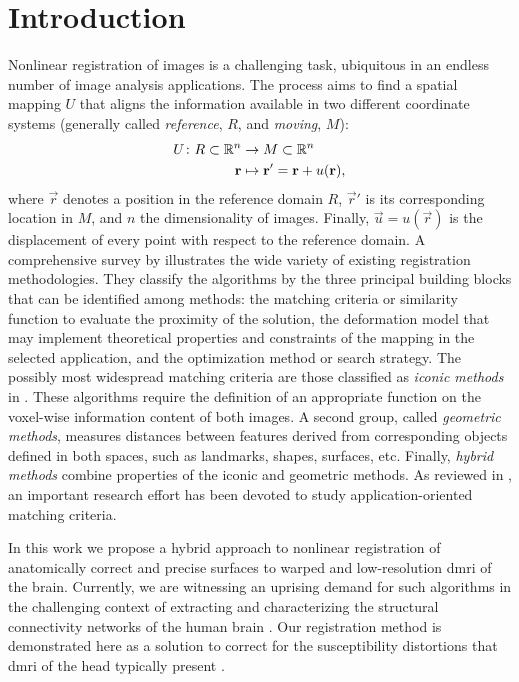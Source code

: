 \section*{Introduction}
\label{sec:introduction}

Nonlinear registration of images is a challenging task, ubiquitous
  in an endless number of image analysis applications.
The process aims to find a spatial mapping $U$ that aligns the information available
  in two different coordinate systems (generally called
  \emph{reference}, $R$, and \emph{moving}, $M$):
  \begin{align}
  U\colon R \subset \mathbb{R}^n &\to M \subset \mathbb{R}^n \notag\\
  \vec{r} &\mapsto \vec{r}' =\vec{r}+u(\vec{r}),
  \label{eq:transform}
  \end{align}
  where $\vec{r}$ denotes a position in the reference domain $R$, $\vec{r}'$ is
  its corresponding location in $M$, and $n$ the dimensionality of images.
Finally, $\vec{u} = u(\vec{r})$ is the displacement of every point with respect
  to the reference domain.
A comprehensive survey by \cite{sotiras_deformable_2013}
  illustrates the wide variety of existing registration methodologies.
They classify the algorithms by the three principal building blocks that can be identified
  among methods: the matching criteria or similarity function to evaluate the proximity of
  the solution, the deformation model that may implement theoretical properties and constraints
  of the mapping in the selected application, and the optimization method or search strategy.
The possibly most widespread matching criteria are those classified as \emph{iconic
  methods} in \citep{sotiras_deformable_2013}.
These algorithms require the definition of an appropriate function on the voxel-wise information
  content of both images.
A second group, called \emph{geometric methods}, measures distances between features derived from
  corresponding objects defined in both spaces, such as landmarks, shapes, surfaces, etc.
Finally, \emph{hybrid methods} combine properties of the iconic and geometric methods.
As reviewed in \citep{sotiras_deformable_2013}, an important research effort has been devoted to
  study application-oriented matching criteria.

In this work we propose a hybrid approach to nonlinear registration of anatomically correct
  and precise surfaces to warped and low-resolution \gls*{dmri} of the brain.
Currently, we are witnessing an uprising demand for such algorithms in the challenging context
  of extracting and characterizing the structural connectivity networks of the
  human brain \citep{craddock_imaging_2013}.
Our registration method is demonstrated here as a solution to correct for the susceptibility
  distortions that \gls*{dmri} of the head typically present \citep{jezzard_correction_1995}.

